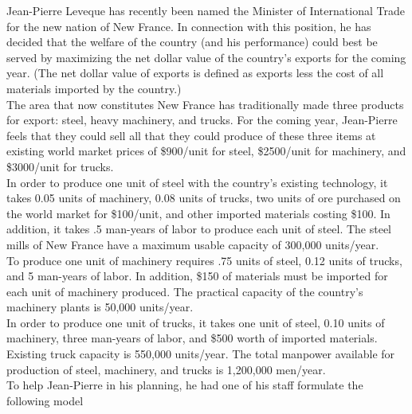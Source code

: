 \documentclass[answers]{exam}
\begin{document}
\begin{questions}
\clearpage

\question
Jean-Pierre Leveque has recently been named the Minister of International Trade for the new nation of New France. In connection with this position, he has decided that the welfare of the country (and his performance) could best be served by maximizing the net dollar value of the country’s exports for the coming year. (The net dollar value of exports is defined as exports less the cost of all materials imported by the country.) \\ 

The area that now constitutes New France has traditionally made three products for export: steel, heavy machinery, and trucks. For the coming year, Jean-Pierre feels that they could sell all that they could produce of these three items at existing world market prices of \$900/unit for steel, \$2500/unit for machinery, and \$3000/unit for trucks. \\

In order to produce one unit of steel with the country’s existing technology, it takes 0.05 units of machinery, 0.08 units of trucks, two units of ore purchased on the world market for \$100/unit, and other imported materials costing \$100. In addition, it takes .5 man-years of labor to produce each unit of steel. The steel mills of New France have a maximum usable capacity of 300,000 units/year. \\

To produce one unit of machinery requires .75 units of steel, 0.12 units of trucks, and 5 man-years of labor. In addition, \$150 of materials must be imported for each unit of machinery produced. The practical capacity of the country’s machinery plants is 50,000 units/year. \\

In order to produce one unit of trucks, it takes one unit of steel, 0.10 units of machinery, three man-years of labor, and \$500 worth of imported materials. Existing truck capacity is 550,000 units/year. The total manpower available for production of steel, machinery, and trucks is 1,200,000 men/year. \\

To help Jean-Pierre in his planning, he had one of his staff formulate the following model \\


\end{questions}
\end{document}
